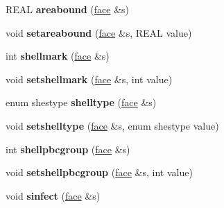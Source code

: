 \begin{DoxyCompactItemize}
\item 
\hypertarget{classtetgenmesh_a589cf429e209ed7575602ede3d158d93}{R\-E\-A\-L {\bfseries areabound} (\hyperlink{classtetgenmesh_1_1face}{face} \&s)}\label{classtetgenmesh_a589cf429e209ed7575602ede3d158d93}

\item 
\hypertarget{classtetgenmesh_a0f80088cbe127eeac6995e365d10eb06}{void {\bfseries setareabound} (\hyperlink{classtetgenmesh_1_1face}{face} \&s, R\-E\-A\-L value)}\label{classtetgenmesh_a0f80088cbe127eeac6995e365d10eb06}

\item 
\hypertarget{classtetgenmesh_ab5a2f1e0884a200fc6152ec15c2531d9}{int {\bfseries shellmark} (\hyperlink{classtetgenmesh_1_1face}{face} \&s)}\label{classtetgenmesh_ab5a2f1e0884a200fc6152ec15c2531d9}

\item 
\hypertarget{classtetgenmesh_aebfb8c5f527b8145bf96d2709993c59d}{void {\bfseries setshellmark} (\hyperlink{classtetgenmesh_1_1face}{face} \&s, int value)}\label{classtetgenmesh_aebfb8c5f527b8145bf96d2709993c59d}

\item 
\hypertarget{classtetgenmesh_ae74473e7056ce15f949ef9551aa54ac9}{enum shestype {\bfseries shelltype} (\hyperlink{classtetgenmesh_1_1face}{face} \&s)}\label{classtetgenmesh_ae74473e7056ce15f949ef9551aa54ac9}

\item 
\hypertarget{classtetgenmesh_a1b7df3a782d5e3874185233c659f0dcf}{void {\bfseries setshelltype} (\hyperlink{classtetgenmesh_1_1face}{face} \&s, enum shestype value)}\label{classtetgenmesh_a1b7df3a782d5e3874185233c659f0dcf}

\item 
\hypertarget{classtetgenmesh_a0ea5a4b9b8bc8f7238c63eb538b81d0e}{int {\bfseries shellpbcgroup} (\hyperlink{classtetgenmesh_1_1face}{face} \&s)}\label{classtetgenmesh_a0ea5a4b9b8bc8f7238c63eb538b81d0e}

\item 
\hypertarget{classtetgenmesh_a72484f5241f39bd891a98cd284258ece}{void {\bfseries setshellpbcgroup} (\hyperlink{classtetgenmesh_1_1face}{face} \&s, int value)}\label{classtetgenmesh_a72484f5241f39bd891a98cd284258ece}

\item 
\hypertarget{classtetgenmesh_aa417a432076c7de138fed761c5322f4f}{void {\bfseries sinfect} (\hyperlink{classtetgenmesh_1_1face}{face} \&s)}\label{classtetgenmesh_aa417a432076c7de138fed761c5322f4f}


\end{DoxyCompactItemize}
